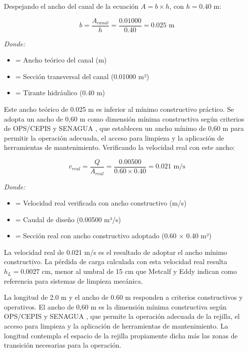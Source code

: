 \documentclass[12pt,a4paper]{article}
\begin{document}
Despejando el ancho del canal de la ecuación $A = b \times h$, con $h = 0.40$ m:

\begin{equation}
b = \frac{A_{canal}}{h} = \frac{0.01000}{0.40} = 0.025 \text{ m}
\end{equation}

\textit{Donde:}
\begin{itemize}[noitemsep,leftmargin=2em]
    \item[$b$] = Ancho teórico del canal (m)
    \item[$A_{canal}$] = Sección transversal del canal (0.01000 m²)
    \item[$h$] = Tirante hidráulico (0.40 m)
\end{itemize}

Este ancho teórico de 0.025 m es inferior al mínimo constructivo práctico. Se adopta un ancho de 0,60 m como dimensión mínima constructiva según criterios de OPS/CEPIS \cite{ops2005} y SENAGUA \cite{senagua2012}, que establecen un ancho mínimo de 0,60 m para permitir la operación adecuada, el acceso para limpieza y la aplicación de herramientas de mantenimiento. Verificando la velocidad real con este ancho:

\begin{equation}
v_{real} = \frac{Q}{A_{real}} = \frac{0.00500}{0.60 \times 0.40} = 0.021 \text{ m/s}
\end{equation}

\textit{Donde:}
\begin{itemize}[noitemsep,leftmargin=2em]
    \item[$v_{real}$] = Velocidad real verificada con ancho constructivo (m/s)
    \item[$Q$] = Caudal de diseño (0.00500 m³/s)
    \item[$A_{real}$] = Sección real con ancho constructivo adoptado (0.60 × 0.40 m²)
\end{itemize}

La velocidad real de 0.021 m/s es el resultado de adoptar el ancho mínimo constructivo. La pérdida de carga calculada con esta velocidad real resulta $h_L = 0.0027$ cm, menor al umbral de 15 cm que Metcalf y Eddy \cite{metcalf2014} indican como referencia para sistemas de limpieza mecánica.

La longitud de 2.0 m y el ancho de 0.60 m responden a criterios constructivos y operativos. El ancho de 0,60 m es la dimensión mínima constructiva según OPS/CEPIS \cite{ops2005} y SENAGUA \cite{senagua2012}, que permite la operación adecuada de la rejilla, el acceso para limpieza y la aplicación de herramientas de mantenimiento. La longitud contempla el espacio de la rejilla propiamente dicha más las zonas de transición necesarias para la operación.
\end{document}

